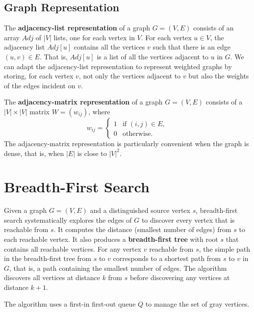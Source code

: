 \subsection*{Graph Representation}

The \textbf{adjacency-list representation} of a graph $G = (V, E)$ consists of an array $Adj$ of $|V|$ lists, one for each vertex in $V$. For each vertex $u \in V$, the adjacency list $Adj[u]$ contains all the vertices $v$ such that there is an edge $(u, v) \in E$. That is, $Adj[u]$ is a list of all the vertices adjacent to $u$ in $G$.
We can adapt the adjacency-list representation to represent weighted graphs by storing, for each vertex $v$, not only the vertices adjacent to $v$ but also the weights of the edges incident on $v$.

The \textbf{adjacency-matrix representation} of a graph $G = (V, E)$ consists of a $|V| \times |V|$ matrix $W = (w_{ij})$, where
$$
    w_{ij} = 
    \begin{cases}
        1 & \text{if } (i, j) \in E, \\
        0 & \text{otherwise}.
    \end{cases}
$$
The adjacency-matrix representation is particularly convenient when the graph is dense, that is, when $|E|$ is close to $|V|^2$.

\section{Breadth-First Search}

Given a graph $G = (V, E)$ and a distinguished source vertex $s$, breadth-first search systematically explores the edges of $G$ to discover every vertex that is reachable from $s$. It computes the distance (smallest number of edges) from $s$ to each reachable vertex.
It also produces a \textbf{breadth-first tree} with root $s$ that contains all reachable vertices. For any vertex $v$ reachable from $s$, the simple path in the breadth-first tree from $s$ to $v$ corresponds to a shortest path from $s$ to $v$ in $G$, that is, a path containing the smallest number of edges.
The algorithm discovers all vertices at distance $k$ from $s$ before discovering any
vertices at distance $k+1$.

\begin{observationblock}
The algorithm uses a first-in first-out queue $Q$ to manage the set of gray vertices. 
\end{observationblock}

